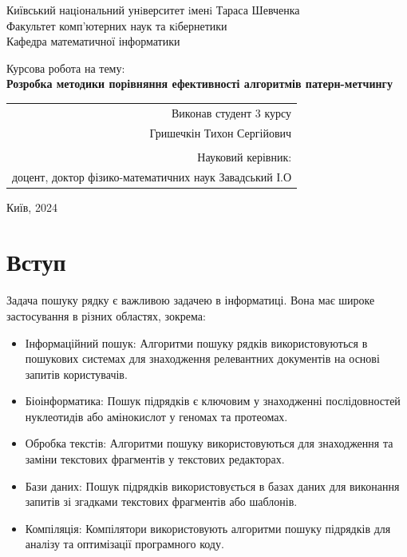 \documentclass[a4paper,14pt]{extarticle} %
\begin{document}
	

    \begin{titlepage}
        \centering
        \large
        Київський нацiональний унiверситет iменi Тараса Шевченка\\
        Факультет комп’ютерних наук та кiбернетики\\
        Кафедра математичної інформатики\\
        
        \vspace*{4cm}
        
        \huge Курсова робота на тему: \\
            \textbf{Розробка методики порівняння ефективності алгоритмів патерн-метчингу}
        
        \vspace{4cm}
        
        \raggedleft
        \large
        \begin{tabular}{r}
            Виконав студент 3 курсу \\
            Гришечкін Тихон Сергійович \\
            \\
            Науковий керівник: \\
            доцент, доктор фізико-математичних наук Завадський І.О \\
        \end{tabular}
        
        \vfill
        
        \centering
        \large
        Київ, 2024
        
    \end{titlepage}
    
    \tableofcontents
    \newpage
    
    \section{Вступ}

	Задача пошуку рядку є важливою задачею в інформатиці. Вона має широке застосування в різних областях, зокрема:

\begin{itemize}
    \item Інформаційний пошук: Алгоритми пошуку рядків використовуються в пошукових системах для
	знаходження релевантних документів на основі запитів користувачів.
    \item Біоінформатика: Пошук підрядків є ключовим у знаходженні послідовностей нуклеотидів або амінокислот у геномах та протеомах. \cite{dna}
    \item Обробка текстів: Алгоритми пошуку використовуються для знаходження та заміни текстових фрагментів у текстових редакторах.
    \item Бази даних: Пошук підрядків використовується в базах даних для виконання запитів зі згадками текстових фрагментів або шаблонів.
    \item Компіляція: Компілятори використовують алгоритми пошуку підрядків для аналізу та оптимізації програмного коду.

\end{itemize}
\end{document}
